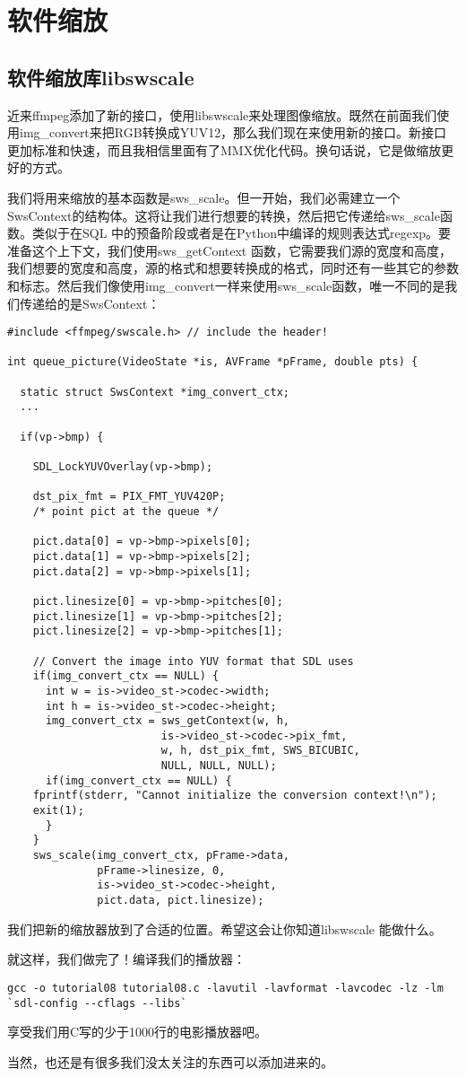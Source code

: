 ﻿\chapter{软件缩放}
\label{ch8}
\section{软件缩放库libswscale}
近来ffmpeg添加了新的接口，使用libswscale来处理图像缩放。既然在前面我们使用img_convert来把RGB转换成YUV12，那么我们现在来使用新的接口。新接口更加标准和快速，而且我相信里面有了MMX优化代码。换句话说，它是做缩放更好的方式。

我们将用来缩放的基本函数是sws_scale。但一开始，我们必需建立一个SwsContext的结构体。这将让我们进行想要的转换，然后把它传递给sws_scale函数。类似于在SQL 中的预备阶段或者是在Python中编译的规则表达式regexp。要准备这个上下文，我们使用sws_getContext 函数，它需要我们源的宽度和高度，我们想要的宽度和高度，源的格式和想要转换成的格式，同时还有一些其它的参数和标志。然后我们像使用img_convert一样来使用sws_scale函数，唯一不同的是我们传递给的是SwsContext：
\begin{lstlisting}
#include <ffmpeg/swscale.h> // include the header!

int queue_picture(VideoState *is, AVFrame *pFrame, double pts) {

  static struct SwsContext *img_convert_ctx;
  ...

  if(vp->bmp) {

    SDL_LockYUVOverlay(vp->bmp);

    dst_pix_fmt = PIX_FMT_YUV420P;
    /* point pict at the queue */

    pict.data[0] = vp->bmp->pixels[0];
    pict.data[1] = vp->bmp->pixels[2];
    pict.data[2] = vp->bmp->pixels[1];

    pict.linesize[0] = vp->bmp->pitches[0];
    pict.linesize[1] = vp->bmp->pitches[2];
    pict.linesize[2] = vp->bmp->pitches[1];

    // Convert the image into YUV format that SDL uses
    if(img_convert_ctx == NULL) {
      int w = is->video_st->codec->width;
      int h = is->video_st->codec->height;
      img_convert_ctx = sws_getContext(w, h,
                        is->video_st->codec->pix_fmt,
                        w, h, dst_pix_fmt, SWS_BICUBIC,
                        NULL, NULL, NULL);
      if(img_convert_ctx == NULL) {
    fprintf(stderr, "Cannot initialize the conversion context!\n");
    exit(1);
      }
    }
    sws_scale(img_convert_ctx, pFrame->data,
              pFrame->linesize, 0,
              is->video_st->codec->height,
              pict.data, pict.linesize);
\end{lstlisting}

我们把新的缩放器放到了合适的位置。希望这会让你知道libswscale 能做什么。

就这样，我们做完了！编译我们的播放器：
\begin{lstlisting}
gcc -o tutorial08 tutorial08.c -lavutil -lavformat -lavcodec -lz -lm `sdl-config --cflags --libs`
\end{lstlisting}
享受我们用C写的少于1000行的电影播放器吧。

当然，也还是有很多我们没太关注的东西可以添加进来的。

